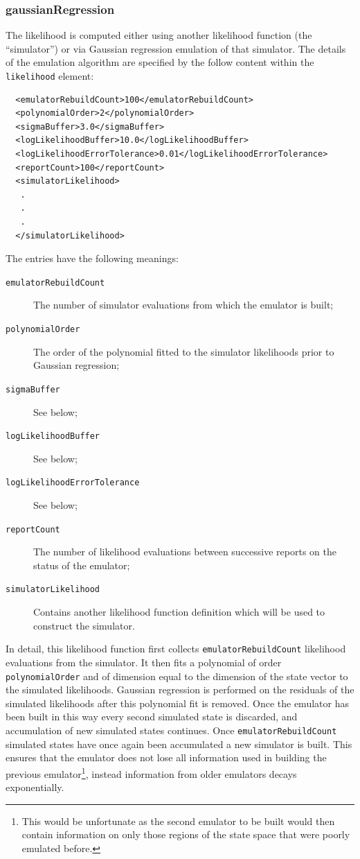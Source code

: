 \subsubsection{gaussianRegression}

The likelihood is computed either using another likelihood function (the ``simulator'') or via Gaussian regression emulation of that simulator. The details of the emulation algorithm are specified by the follow content within the {\tt likelihood} element:
\begin{verbatim}
  <emulatorRebuildCount>100</emulatorRebuildCount>
  <polynomialOrder>2</polynomialOrder>
  <sigmaBuffer>3.0</sigmaBuffer>
  <logLikelihoodBuffer>10.0</logLikelihoodBuffer>
  <logLikelihoodErrorTolerance>0.01</logLikelihoodErrorTolerance>
  <reportCount>100</reportCount>
  <simulatorLikelihood>
   .
   .
   .
  </simulatorLikelihood>
\end{verbatim}

The entries have the following meanings:
\begin{description}
\item[{\tt emulatorRebuildCount}] The number of simulator evaluations from which the emulator is built;
\item[{\tt polynomialOrder}] The order of the polynomial fitted to the simulator likelihoods prior to Gaussian regression;
\item[{\tt sigmaBuffer}] See below;
\item[{\tt logLikelihoodBuffer}] See below;
\item[{\tt logLikelihoodErrorTolerance}] See below;
\item[{\tt reportCount}] The number of likelihood evaluations between successive reports on the status of the emulator;
\item[{\tt simulatorLikelihood}] Contains another likelihood function definition which will be used to construct the simulator.
\end{description}

In detail, this likelihood function first collects {\tt emulatorRebuildCount} likelihood evaluations from the simulator. It then fits a polynomial of order {\tt polynomialOrder} and of dimension equal to the dimension of the state vector to the simulated likelihoods. Gaussian regression is performed on the residuals of the simulated likelihoods after this polynomial fit is removed. Once the emulator has been built in this way every second simulated state is discarded, and accumulation of new simulated states continues. Once {\tt emulatorRebuildCount} simulated states have once again been accumulated a new simulator is built. This ensures that the emulator does not lose all information used in building the previous emulator\footnote{This would be unfortunate as the second emulator to be built would then contain information on only those regions of the state space that were poorly emulated before.}, instead information from older emulators decays exponentially.

